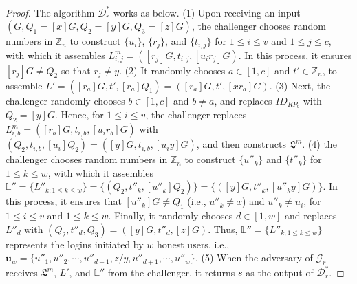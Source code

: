 \begin{theorem}
\begin{proof}
  The algorithm $\mathcal{D}^*_r$ works as below. (1) Upon receiving an input $(G, Q_1=[x]G, Q_2=[y]G, Q_3=[z]G)$, %
  the challenger
  chooses random numbers in $\mathbb{Z}_n$ to construct $\{u_i\}$, $\{r_j\}$, and $\{t_{i, j}\}$ for $1 \le i \le v$ and $1 \le j \le c$, with which it assembles $L^m_{i, j}=([r_j]G, t_{i,j}, [u_ir_j]G)$.
  In this process, it ensures $[r_{j}]G \neq Q_2$ so that $r_j \neq y$.  %
  (2) It randomly chooses $a \in [1, c]$ and $t' \in \mathbb{Z}_n$, to assemble $L' = ([r_{a}]G, t', [r_{a}]Q_1) = ([r_{a}]G, t', [xr_{a}]G)$.
  (3)
  Next, the challenger randomly chooses $b \in [1, c]$ and $b \neq a$, and replaces $ID_{RP_b}$ with $Q_2 = [y]G$.
  Hence, for $1 \le i \le v$, the challenger replaces $L^m_{i, b}=([r_b]G, t_{i,b}, [u_ir_b]G)$ with $(Q_2, t_{i,b}, [u_i]Q_2) = ([y]G, t_{i,b}, [u_iy]G)$, and then constructs $\mathfrak{L}^m$.
  (4) the challenger chooses random numbers in $\mathbb{Z}_n$ to construct $\{u''_k\}$ and $\{t''_k\}$ for $1 \leq k \leq w$,
  with which it assembles $\mathbb{L}'' = \{L''_{k; 1\leq k \leq w}\} = \{(Q_2, t''_k, [u''_k]Q_2)\} = \{([y]G, t''_k, [u''_ky]G)\}$.
  In this process, it ensures that $[u''_k]G \neq Q_1$ (i.e., $u''_k \neq x$) and $u''_k \neq u_i$,
  for $1 \le i \le v$ and $1 \le k \le w$.
  Finally, it randomly chooses $d \in [1, w]$ and replaces $L''_{d}$ with $(Q_2, t''_d, Q_3) = ([y]G, t''_d, [z]G)$.
  Thus, $\mathbb{L}'' = \{L''_{k;1\leq k \leq w}\}$ represents the logins initiated by $w$ honest users, i.e., $\mathbf{u}_w=\{u''_1, u''_2, \cdots, u''_{d-1}, z/y, u''_{d+1}, \cdots, u''_w\}$.
  (5) When the adversary of $\mathcal{G}_r$ receives $\mathfrak{L}^m$, $L'$, and $\mathbb{L}''$ from the challenger, it returns $s$ as the output of $\mathcal{D}^*_r$.


\end{proof}
\end{theorem}
